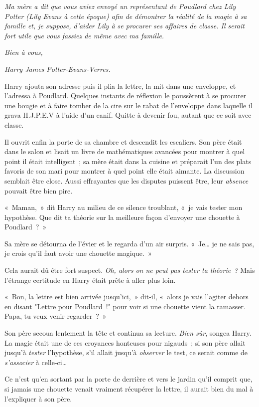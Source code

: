 \emph{Ma mère a dit que vous aviez envoyé un représentant de Poudlard chez Lily Potter (Lily Evans à cette époque) afin de démontrer la réalité de la magie à sa famille et, je suppose, d'aider Lily à se procurer ses affaires de classe. Il serait fort utile que vous fassiez de même avec ma famille.} 

\emph{Bien à vous,} 

\emph{Harry James Potter-Evans-Verres.} 

Harry ajouta son adresse puis il plia la lettre, la mit dans une enveloppe, et l'adressa à Poudlard. Quelques instants de réflexion le poussèrent à se procurer une bougie et à faire tomber de la cire sur le rabat de l'enveloppe dans laquelle il grava H.J.P.E.V à l'aide d'un canif. Quitte à devenir fou, autant que ce soit avec classe. 

Il ouvrit enfin la porte de sa chambre et descendit les escaliers. Son père était dans le salon et lisait un livre de mathématiques avancées pour montrer à quel point il était intelligent~; sa mère était dans la cuisine et préparait l'un des plats favoris de son mari pour montrer à quel point elle était aimante. La discussion semblait être close. Aussi effrayantes que les disputes puissent être, leur \emph{absence} pouvait être bien pire. 

«~Maman,~» dit Harry au milieu de ce silence troublant, «~je vais tester mon hypothèse. Que dit ta théorie sur la meilleure façon d'envoyer une chouette à Poudlard~?~» 

Sa mère se détourna de l'évier et le regarda d'un air surpris. «~Je\ldots{} je ne sais pas, je crois qu'il faut avoir une chouette magique.~» 

Cela aurait dû être fort suspect. \emph{Oh, alors on ne peut pas tester ta théorie~?} Mais l'étrange certitude en Harry était prête à aller plus loin. 

«~Bon, la lettre est bien arrivée jusqu'ici,~» dit-il, «~alors je vais l'agiter dehors en disant "Lettre pour Poudlard~!" pour voir si une chouette vient la ramasser. Papa, tu veux venir regarder~?~» 

Son père secoua lentement la tête et continua sa lecture. \emph{Bien sûr}, songea Harry. La magie était une de ces croyances honteuses pour nigauds~; si son père allait jusqu'à \emph{tester} l'hypothèse, s'il allait jusqu'à \emph{observer} le test, ce serait comme de \emph{s'associer} à celle-ci\ldots{} 

Ce n'est qu'en sortant par la porte de derrière et vers le jardin qu'il comprit que, si jamais une chouette venait vraiment récupérer la lettre, il aurait bien du mal à l'expliquer à son père. 

